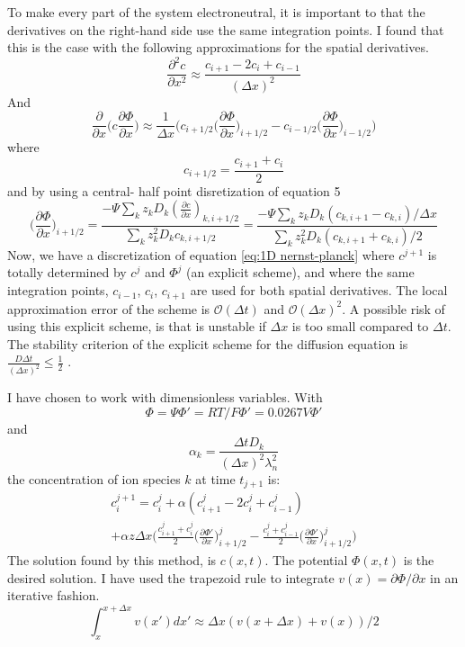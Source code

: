 \documentclass{article}
\begin{document}
To make every part of the system electroneutral, it is important to that the derivatives on the right-hand side use the same integration points. I found that this is the case with the following approximations for the spatial derivatives. 
$$\frac{\partial^2 c}{\partial x^2} \approx \frac{c_{i+1}-2c_i+c_{i-1}}{(\Delta x)^2}$$
And 
$$\frac{\partial }{\partial x}  \bigg(c \frac{\partial \Phi}{\partial x} \bigg)\approx \frac{1}{\Delta x}\bigg( c_{i+1/2} \big(\frac{\partial \Phi}{\partial x}\big)_{i+1/2} -  c_{i-1/2} \big(\frac{\partial \Phi}{\partial x}\big)_{i-1/2} \bigg) $$
where 
$$c_{i+ 1/2} = \frac{c_{i+1}+ c_i}{2}$$
and by using a central- half point disretization of equation 5
\begin{equation}\label{eq:gradPhi}
\big(\frac{\partial \Phi}{\partial x}\big)_{i+1/2} = \frac{-\Psi \sum_k z_k D_k (\frac{\partial c}{\partial x})_{k,i+1/2}}{\sum_k z_k^2 D_k c_{k,i+1/2}}= \frac{-\Psi \sum_k z_k D_k (c_{k,i+1}-c_{k,i})/\Delta x }{\sum_k z_k^2 D_k (c_{k,i+1}+c_{k,i})/2}
\end{equation}
Now, we have a discretization of equation \ref{eq:1D nernst-planck} where $c^{j+1}$ is totally determined by $c^j$ and $\Phi^j$ (an explicit scheme), and where the same integration points, $c_{i-1}$, $c_i$, $c_{i+1}$ are used for both spatial derivatives. The local approximation error of the scheme is $\mathcal{O}(\Delta t)$ and $\mathcal{O}(\Delta x)^2$. A possible risk of using this explicit scheme, is that is unstable if $\Delta x$ is too small compared to $\Delta t$. The stability criterion of the explicit scheme for the diffusion equation is $\frac{D\Delta t}{(\Delta x)^2} \leq \frac{1}{2}$ \cite{lecturenotes}.

I have chosen to work with dimensionless variables. With $$\Phi = \Psi\Phi' = RT/F\Phi' = 0.0267V \Phi'$$ and $$\alpha_k = \frac{\Delta t D_k}{(\Delta x)^2 \lambda_n^2}$$ the concentration of ion species $k$ at time $t_{j+1}$ is:
\begin{multline}\label{eq:c_i+1}
 c_i^{j+1}= c_i^j + \alpha(c_{i+1}^j-2c_i^j+c_{i-1}^j)\\ + \alpha z\Delta x \bigg(\frac{c_{i+1}^j+c_i^j}{2} \big(\frac{\partial \Phi'}{\partial x}\big)_{i+1/2}^j-\frac{c_{i}^j+c_{i-1}^j}{2} \big(\frac{\partial \Phi'}{\partial x}\big)_{i+1/2}^j\bigg)
\end{multline}
The solution found by this method, is $c(x,t)$. The potential $\Phi(x,t)$ is the desired solution. I have used the trapezoid rule to integrate $v(x) =\partial \Phi / \partial x$ in an iterative fashion.
\begin{equation}
\int_x^{x+\Delta x}v(x') dx'  \approx \Delta x ( v(x+\Delta x) + v(x) )/2
\end{equation}
\end{document}
